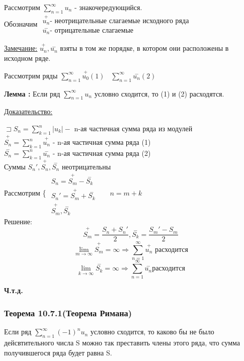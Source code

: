 \documentclass[12pt]{article}
\let\oldsum\sum
\let\oldlim\lim
\renewcommand{\sum}{\oldsum\limits}
\renewcommand{\lim}{\oldlim\limits}
\begin{document}
  Рассмотрим $\sum_{n=1}^{\infty} u_n$ - знакочередующийся. \\
  Обозначим $
  \begin{matrix}
    \overset{+}{u_n} \text{-  неотрицательные слагаемые исходного ряда}\\
    \overset{-}{u_n} \text{- отрицательные слагаемые}
  \end{matrix}$

  \underline{Замечание:} $\overset{+}{u_n},\overset{-}{u_n}$ взяты в том же порядке, в котором они расположены
  в исходном ряде.

  Рассмотрим ряды $\sum_{n=1}^{\infty} \overset{+}{u_0}(1) \hspace{10pt} \sum_{n=1}^{\infty}\overset{-}{u_n}(2)$
  
  \textbf{Лемма :} Если ряд $\sum_{n=1}^{\infty} u_n$ условно сходится, то (1) и (2) расходятся.

  \underline{Доказательство:}
  \begin{adjustwidth}{1.5em}{1.5em}
    $\sqsupset S_n = \sum_{k=1}^{n} |u_k| -$ n-ая частичная сумма ряда из модулей\\
    $\overset{+}{S_n} = \sum_{k=1}^{n} \overset{+}{u_n}$ - n-ая частичная сумма ряда (1)\\
    $\overset{-}{S_n} = \sum_{k=1}^{n} \overset{-}{u_n}$ - n-ая частичная сумма ряда (2)\\
    Суммы $S_n',\overset{+}{S_n}, \overset{-}{S_n}$ неотрицательны\\
    Рассмотрим \Bigg\{
    $
    \begin{matrix}
      S_n = \overset{+}{S_m} - \overset{-}{S_k}\\
      S_n'=\overset{+}{S_m} + \overset{-}{S_k}\\
      \overset{+}{S_m}, \overset{-}{S_k}
    \end{matrix}
    \hspace{20pt}  n=m+k$\\
    Решение: 
    \[\overset{+}{S_m} = \frac{S_n+S_n'}{2}, \overset{-}{S_k} = \frac{S_m'-S_m}{2}\]
    \[\lim_{m \to \infty} \overset{+}{S_m} = \infty \Rightarrow \sum_{n=1}^{\infty} \overset{+}{u_n} \text{ расходится}\]
    \[\lim_{k \to \infty} \overset{-}{S_k} = \infty \Rightarrow  \sum_{n=1}^{\infty} \overset{-}{u_n} \text{расходится}\]
  \end{adjustwidth}
  \begin{center}
    \textbf{Ч.т.д.}
  \end{center}

  \subsubsection*{Теорема 10.7.1(Теорема Римана)}\label{th:10.7.1}
  \par\noindent
  Если ряд $\sum_{n=1}^{\infty} (-1)^n u_n$ условно сходится, то каково бы не было дейсвтительного числа
  S можно так преставить члены этого ряда, что сумма получившегося ряда будет равна S.
\end{document}
